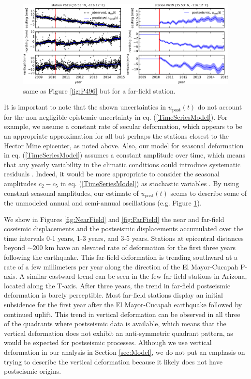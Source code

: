 \documentclass[draft,linenumbers]{AGUJournal}
\begin{document}
\begin{figure}
\noindent\includegraphics[scale=0.9]{Figures/2016jb013114-p03}
\centering
\caption{same as Figure \ref{fig:P496} but for a far-field station.} 
\label{fig:P619}
\end{figure}

It is important to note that the shown uncertainties in $u_\mathrm{post}(t)$ do not account for the non-negligible epistemic uncertainty in eq. (\ref{TimeSeriesModel}).  For example, we assume a constant rate of secular deformation, which appears to be an appropriate approximation for all but perhaps the stations closest to the Hector Mine epicenter, as noted above.  Also, our model for seasonal deformation in eq. (\ref{TimeSeriesModel}) assumes a constant amplitude over time, which means that any yearly variability in the climatic conditions could introduce systematic residuals \citep{Davis2012}. Indeed, it would be more appropriate to consider the seasonal amplitudes $c_2-c_5$ in eq. (\ref{TimeSeriesModel}) as stochastic variables \citep{Murray2005}. By using constant seasonal amplitudes, our estimate of $u_\mathrm{post}(t)$ seems to describe some of the unmodeled annual and semi-annual oscillations (e.g. Figure \ref{fig:P619}).          

We show in Figures \ref{fig:NearField} and \ref{fig:FarField} the near and far-field coseismic displacements and the postseismic displacements accumulated over the time intervals 0-1 years, 1-3 years, and 3-5 years.  Stations at epicentral distances beyond ${\sim}200$ km have an elevated rate of deformation for the first three years following the earthquake.  This far-field deformation is trending southward at a rate of a few millimeters per year along the direction of the El Mayor-Cucapah P-axis.  A similar eastward trend can be seen in the few far-field stations in Arizona, located along the T-axis.  After three years, the trend in far-field postseismic deformation is barely perceptible.  Most far-field stations display an initial subsidence for the first year after the El Mayor-Cucapah earthquake followed by continued uplift.  This trend in vertical deformation can be observed in all three of the quadrants where postseismic data is available, which means that the vertical deformation does not exhibit an anti-symmetric quadrant pattern, as would be expected for postseismic processes.  Although we use vertical deformation in our analysis in Section \ref{sec:Model},  we do not put an emphasis on trying to describe the vertical deformation because it likely does not have postseismic origins.        
\end{document}
